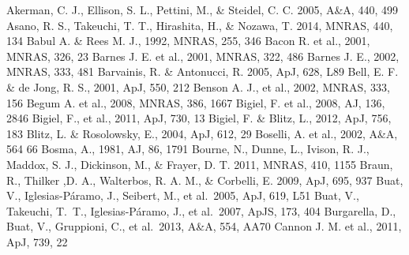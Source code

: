 \begin{thebibliography}{99}
\begin{multicols}{2}{\footnotesize
 	Akerman, C. J., Ellison, S. L., Pettini, M., \& Steidel, C. C. 2005, A\&A, 440, 499
	Asano, R. S., Takeuchi, T. T., Hirashita, H., \& Nozawa, T. 2014,
	MNRAS, 440, 134
	Babul A. \& Rees M. J., 1992, MNRAS, 255, 346
	Bacon R. et al., 2001, MNRAS, 326, 23
	Barnes J. E. et al., 2001, MNRAS, 322, 486
	Barnes J. E., 2002, MNRAS, 333, 481
	Barvainis, R. \& Antonucci, R. 2005, ApJ, 628, L89
	Bell, E. F. \& de Jong, R. S., 2001, ApJ, 550, 212
	Benson A. J., et al., 2002, MNRAS, 333, 156
	Begum A. et al., 2008, MNRAS, 386, 1667
	Bigiel, F. et al., 2008, AJ, 136, 2846
	Bigiel, F., et al., 2011, ApJ, 730, 13
	Bigiel, F. \& Blitz, L., 2012, ApJ, 756, 183
	Blitz, L. \& Rosolowsky, E., 2004, ApJ, 612, 29
	Boselli, A. et al., 2002, A\&A, 564 66
	Bosma, A., 1981, AJ, 86, 1791
    	Bourne, N., Dunne, L., Ivison, R. J., Maddox, S. J., Dickinson, M.,
    	\& Frayer, D. T. 2011, MNRAS, 410, 1155
   	Braun, R., Thilker ,D. A., Walterbos, R. A. M., \& Corbelli, E. 2009,
   	ApJ, 695, 937
	Buat, V., Iglesias-P{\'a}ramo, J., Seibert, M., et al.\ 2005, ApJ, 619, L51 
	Buat, V., Takeuchi, T.~T., Iglesias-P{\'a}ramo, J., et al.\ 2007, ApJS, 173, 404 
	Burgarella, D., Buat, V., Gruppioni, C., et al.\ 2013, A\&A, 554, AA70 
	Cannon J. M. et al., 2011, ApJ, 739, 22
}
\end{multicols}
\end{thebibliography}
